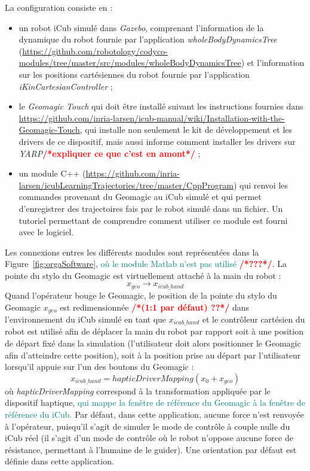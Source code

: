\documentclass[utf8]{frontiersSCNS} %
\newcommand{\toimprove}[1]{\textcolor{teal}{#1}}
\newcommand{\todo}[1]{\textcolor{red}{\textbf{/*#1*/}}}
\begin{document}
La configuration consiste en :
\begin{itemize}
\item un robot iCub simulé dans \textit{Gazebo}, comprenant l'information de la dynamique du robot fournie par l'application \textit{wholeBodyDynamicsTree} (\url{https://github.com/robotology/codyco-modules/tree/master/src/modules/wholeBodyDynamicsTree}) et l'information sur les positions cartésiennes du robot fournie par l'application \textit{iKinCartesianController} ;
\item le \textit{Geomagic Touch} qui doit être installé suivant les instructions fournies dans \url{https://github.com/inria-larsen/icub-manual/wiki/Installation-with-the-Geomagic-Touch}, qui installe non seulement le kit de développement et les drivers de ce dispositif, mais aussi informe comment installer les drivers sur \textit{YARP}\todo{expliquer ce que c'est en amont} ;
\item un module C++ (\url{https://github.com/inria-larsen/icubLearningTrajectories/tree/master/CppProgram}) qui renvoi les commandes provenant du Geomagic au iCub simulé et qui permet d'enregistrer des trajectoires fais par le robot simulé dans un fichier. Un tutoriel permettant de comprendre comment utiliser ce module est fourni avec le logiciel.
\end{itemize}

Les connexions entres les différents modules sont représentées dans la Figure~\ref{fig:orgaSoftware}, \toimprove{où le module Matlab n'est pas utilisé} \todo{???}.
La pointe du stylo du Geomagic est virtuellement attaché à la main du robot :
$$ x_{geo} \rightarrow x_{icub\_hand} $$
Quand l'opérateur bouge le Geomagic, le position de la pointe du stylo du Geomagic $x_{geo}$ est redimensionnée \todo{(1:1 par défaut) ??} dans l'environnement du iCub simulé en tant que $x_{icub\_hand}$ et le contrôleur cartésien du robot est utilisé afin de déplacer la main du robot par rapport soit à une position de départ fixé dans la simulation (l'utilisateur doit alors positionner le Geomagic afin d'atteindre cette position), soit à la position prise au départ par l'utilisateur lorsqu'il appuie sur l'un des boutons du Geomagic :
$$ x_{icub\_hand} = hapticDriverMapping(x_0 + x_{geo})$$
où \textit{hapticDriverMapping} correspond à la transformation appliquée par le dispositif haptique, \toimprove{qui mappe la fenêtre de référence du Geomagic à la fenêtre de référence du iCub.}
Par défaut, dans cette application, aucune force n'est renvoyée à l'opérateur, puisqu'il s'agit de simuler le mode de contrôle à couple nulle du iCub réel (il s'agit d'un mode de contrôle où le robot n'oppose aucune force de résistance, permettant à l'humaine de le guider). Une orientation par défaut est définie dans cette application.
\end{document}
